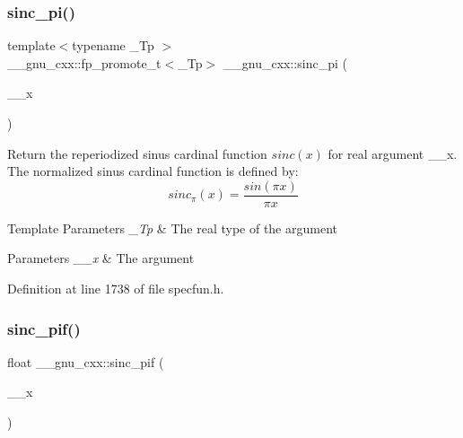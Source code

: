 \subsubsection{\texorpdfstring{sinc\+\_\+pi()}{sinc\_pi()}}
{\footnotesize\ttfamily template$<$typename \+\_\+\+Tp $>$ \\
\+\_\+\+\_\+gnu\+\_\+cxx\+::fp\+\_\+promote\+\_\+t$<$\+\_\+\+Tp$>$ \+\_\+\+\_\+gnu\+\_\+cxx\+::sinc\+\_\+pi (\begin{DoxyParamCaption}\item[{\+\_\+\+Tp}]{\+\_\+\+\_\+x }\end{DoxyParamCaption})\hspace{0.3cm}{\ttfamily [inline]}}

Return the reperiodized sinus cardinal function $ sinc(x) $ for real argument {\ttfamily \+\_\+\+\_\+x}. The normalized sinus cardinal function is defined by\+: \[ sinc_\pi(x) = \frac{sin(\pi x)}{\pi x} \]


\begin{DoxyTemplParams}{Template Parameters}
{\em \+\_\+\+Tp} & The real type of the argument \\
\hline
\end{DoxyTemplParams}

\begin{DoxyParams}{Parameters}
{\em \+\_\+\+\_\+x} & The argument \\
\hline
\end{DoxyParams}


Definition at line 1738 of file specfun.\+h.

\mbox{\label{group__mathsf__gnu_gad92d43d5332c80d1a27c90bfe3f6417e}} 
\subsubsection{\texorpdfstring{sinc\+\_\+pif()}{sinc\_pif()}}
{\footnotesize\ttfamily float \+\_\+\+\_\+gnu\+\_\+cxx\+::sinc\+\_\+pif (\begin{DoxyParamCaption}\item[{float}]{\+\_\+\+\_\+x }\end{DoxyParamCaption})\hspace{0.3cm}{\ttfamily [inline]}}

